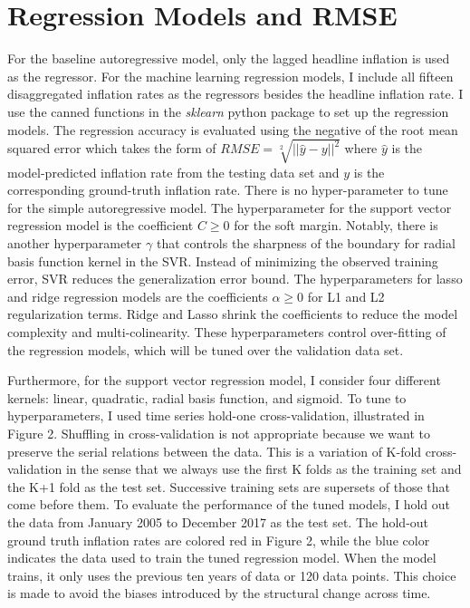 \documentclass[10pt,twocolumn,letterpaper]{article}
\begin{document}
\section{Regression Models and RMSE}
For the baseline autoregressive model, only the lagged headline inflation is used as the regressor. For the machine learning regression models, I include all fifteen disaggregated inflation rates as the regressors besides the headline inflation rate. I use the canned functions in the \textit{sklearn} python package to set up the regression models. The regression accuracy is evaluated using the negative of the root mean squared error which takes the form of $RMSE = \sqrt[2]{||\hat y - y||^2}$ where $\hat y$ is the model-predicted inflation rate from the testing data set and $y$ is the corresponding ground-truth inflation rate. There is no hyper-parameter to tune for the simple autoregressive model. The hyperparameter for the support vector regression model is the coefficient $C \geq 0$ for the soft margin. Notably, there is another hyperparameter $ \gamma $ that controls the sharpness of the boundary for radial basis function kernel in the SVR. Instead of minimizing the observed training error, SVR reduces the generalization error bound. The hyperparameters for lasso and ridge regression models are the coefficients $\alpha \geq 0$ for L1 and L2 regularization terms. Ridge and Lasso shrink the coefficients to reduce the model complexity and multi-colinearity. These hyperparameters control over-fitting of the regression models, which will be tuned over the validation data set.

Furthermore, for the support vector regression model, I consider four different kernels: linear, quadratic, radial basis function, and sigmoid. To tune to hyperparameters, I used time series hold-one cross-validation, illustrated in Figure 2. Shuffling in cross-validation is not appropriate because we want to preserve the serial relations between the data. This is a variation of K-fold cross-validation in the sense that we always use the first K folds as the training set and the K+1 fold as the test set. Successive training sets are supersets of those that come before them. 
To evaluate the performance of the tuned models, I hold out the data from January 2005 to December 2017 as the test set. The hold-out ground truth inflation rates are colored red in Figure 2, while the blue color indicates the data used to train the tuned regression model. When the model trains, it only uses the previous ten years of data or 120 data points. This choice is made to avoid the biases introduced by the structural change across time. 
\end{document}
